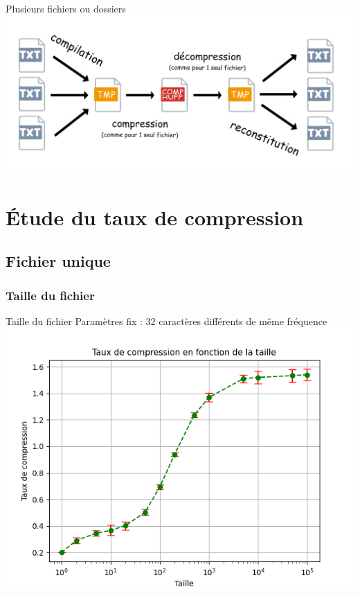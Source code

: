 \documentclass{beamer}
\begin{document}
\begin{frame}{Plusieurs fichiers ou dossiers}
    \includegraphics[scale=0.37]{latex_multifichier.png}
\end{frame}



\section{Étude du taux de compression}

\subsection{Fichier unique}

\subsubsection{Taille du fichier}
\begin{frame}{Taille du fichier}
    Paramètres fix : 32 caractères différents de même fréquence
    \includegraphics[scale=0.66]{taille.png}
\end{frame}
\end{document}
